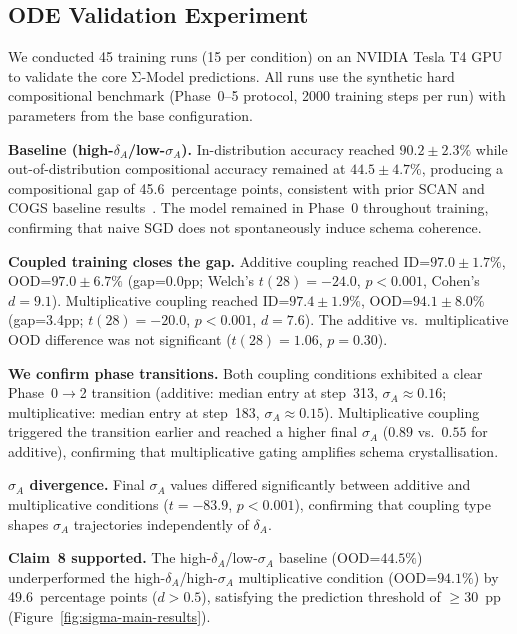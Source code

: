 \documentclass[10pt]{article}
\begin{document}
\subsection{ODE Validation Experiment}\label{sec:ode-exp}

We conducted 45 training runs (15 per condition) on an NVIDIA Tesla T4
GPU to validate the core Σ-Model predictions. All runs use the synthetic
hard compositional benchmark (Phase~0--5 protocol, 2000 training steps
per run) with parameters from the base configuration.

\textbf{Baseline (high-$\delta_A$/low-$\sigma_A$).}
In-distribution accuracy reached $90.2 \pm 2.3\%$ while out-of-distribution
compositional accuracy remained at $44.5 \pm 4.7\%$, producing a
compositional gap of 45.6~percentage points, consistent with prior SCAN and COGS baseline results~\citep{lake2018generalizationwithoutsystematicity,kim2020cogscompositionalgeneralizationchallenge}. The model remained in
Phase~0 throughout training, confirming that naive SGD does not
spontaneously induce schema coherence.

\textbf{Coupled training closes the gap.}
Additive coupling reached ID=$97.0 \pm 1.7\%$, OOD=$97.0 \pm 6.7\%$
(gap=0.0pp; Welch's $t(28)=-24.0$, $p<0.001$, Cohen's $d=9.1$).
Multiplicative coupling reached ID=$97.4 \pm 1.9\%$, OOD=$94.1 \pm 8.0\%$
(gap=3.4pp; $t(28)=-20.0$, $p<0.001$, $d=7.6$). The additive vs.\
multiplicative OOD difference was not significant ($t(28)=1.06$,
$p=0.30$).

\textbf{We confirm phase transitions.}
Both coupling conditions exhibited a clear Phase~0$\to$2 transition
(additive: median entry at step~313, $\sigma_A\approx0.16$;
multiplicative: median entry at step~183, $\sigma_A\approx0.15$).
Multiplicative coupling triggered the transition earlier and reached
a higher final $\sigma_A$ ($0.89$ vs.\ $0.55$ for additive), confirming
that multiplicative gating amplifies schema crystallisation.

\textbf{$\sigma_A$ divergence.}
Final $\sigma_A$ values differed significantly between additive and
multiplicative conditions ($t=-83.9$, $p<0.001$), confirming that
coupling type shapes $\sigma_A$ trajectories independently of
$\delta_A$.

\textbf{Claim~8 supported.} The high-$\delta_A$/low-$\sigma_A$ baseline
(OOD=$44.5\%$) underperformed the high-$\delta_A$/high-$\sigma_A$
multiplicative condition (OOD=$94.1\%$) by 49.6~percentage points
($d>0.5$), satisfying the prediction threshold of $\geq$30~pp %
(Figure~\ref{fig:sigma-main-results}).
\end{document}
